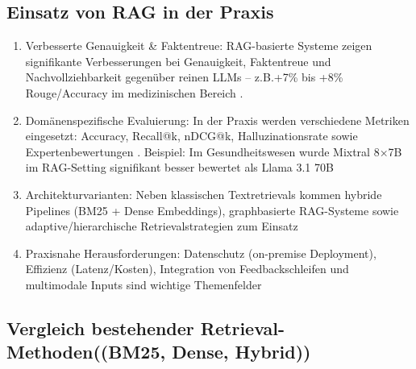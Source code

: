 \subsection{Einsatz von RAG in der Praxis}
\begin{enumerate}
    \item Verbesserte Genauigkeit \& Faktentreue: RAG-basierte Systeme zeigen signifikante Verbesserungen bei Genauigkeit, Faktentreue und Nachvollziehbarkeit gegenüber reinen LLMs – z.B.+7\% bis +8\% Rouge/Accuracy im medizinischen Bereich  \cite{Jeong2024Improving} \cite{Liao2004} \cite{Murtiyoso2025A}.
    \item Domänenspezifische Evaluierung: In der Praxis werden verschiedene Metriken eingesetzt: Accuracy, Recall@k, nDCG@k, Halluzinationsrate sowie Expertenbewertungen \cite{Elmitwalli2025Scalable} \cite{Iyer2025Careful}\cite{Wolk2025Evaluating}. Beispiel: Im Gesundheitswesen wurde Mixtral 8×7B im RAG-Setting signifikant besser bewertet als Llama 3.1 70B \cite{Elmitwalli2025Scalable}
    \item Architekturvarianten: Neben klassischen Textretrievals kommen hybride Pipelines (BM25 + Dense Embeddings), graphbasierte RAG-Systeme sowie adaptive/hierarchische Retrievalstrategien zum Einsatz \cite{Barron2024Domain-Specific}\cite{Jeong2024Improving}\cite{Zhang2025A}\cite{Wolk2025Evaluating}
    \item Praxisnahe Herausforderungen: Datenschutz (on-premise Deployment), Effizienz (Latenz/Kosten), Integration von Feedbackschleifen und multimodale Inputs sind wichtige Themenfelder \cite{Wolk2025Evaluating}
\end{enumerate}



\subsection{Vergleich bestehender Retrieval-Methoden((BM25, Dense, Hybrid))}

